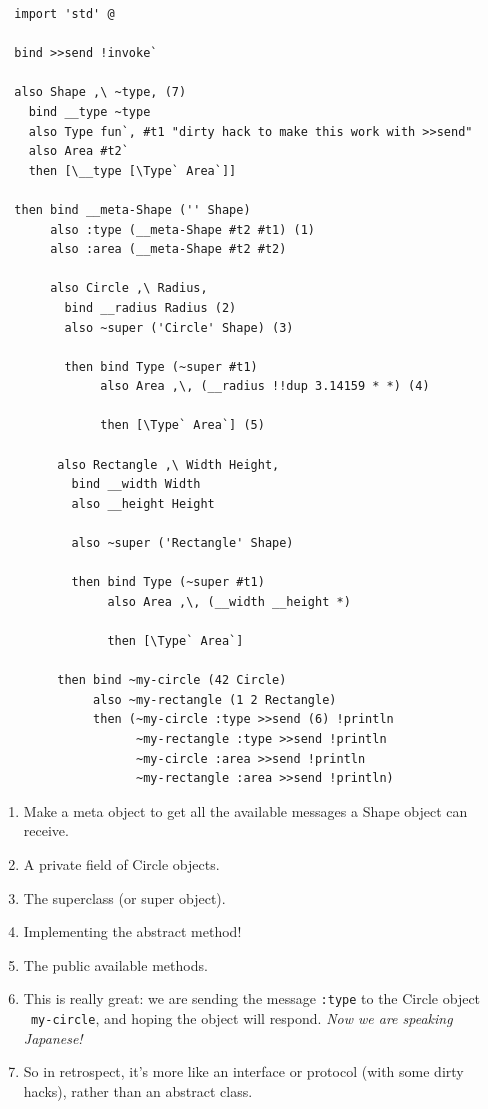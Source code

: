 \documentclass{report}
\newcommand{\mtilde}[1]{\textasciitilde}
\begin{document}
\begin{mdframed}[style=example]
\begin{verbatim}
  import 'std' @

  bind >>send !invoke`

  also Shape ,\ ~type, (7)
    bind __type ~type
    also Type fun`, #t1 "dirty hack to make this work with >>send"
    also Area #t2`
    then [\__type [\Type` Area`]]

  then bind __meta-Shape ('' Shape)
       also :type (__meta-Shape #t2 #t1) (1)
       also :area (__meta-Shape #t2 #t2)

       also Circle ,\ Radius,
         bind __radius Radius (2)
         also ~super ('Circle' Shape) (3)

         then bind Type (~super #t1)
              also Area ,\, (__radius !!dup 3.14159 * *) (4)

              then [\Type` Area`] (5)

        also Rectangle ,\ Width Height,
          bind __width Width
          also __height Height

          also ~super ('Rectangle' Shape)

          then bind Type (~super #t1)
               also Area ,\, (__width __height *)
  
               then [\Type` Area`]

        then bind ~my-circle (42 Circle)
             also ~my-rectangle (1 2 Rectangle)
             then (~my-circle :type >>send (6) !println
                   ~my-rectangle :type >>send !println
                   ~my-circle :area >>send !println
                   ~my-rectangle :area >>send !println)
\end{verbatim}
\end{mdframed}

\begin{enumerate}
\item Make a meta object to get all the available messages a Shape object can receive.
\item A private field of Circle objects.
\item The superclass (or super object).
\item Implementing the abstract method!
\item The public available methods.
\item This is really great: we are sending the message \texttt{:type} to the Circle object \texttt{\mtilde ~my-circle}, and hoping the object will respond. \textit{Now we are speaking Japanese!}
\item So in retrospect, it's more like an interface or protocol (with some dirty hacks), rather than an abstract class.
\end{enumerate}
\end{document}
